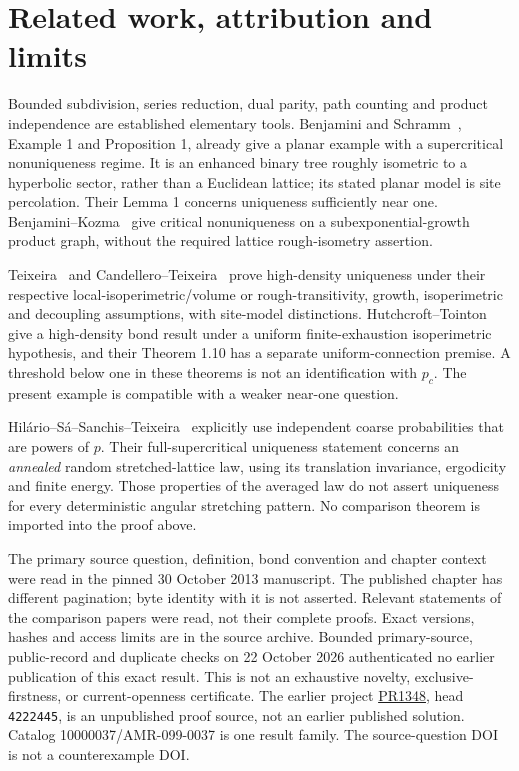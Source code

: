 \documentclass[11pt]{article}
\theoremstyle{definition}
\begin{document}
\section{Related work, attribution and limits}
Bounded subdivision, series reduction, dual parity, path counting and
product independence are established elementary tools.
Benjamini and Schramm~\cite{bs}, Example 1 and Proposition 1,
already give a planar example with a supercritical nonuniqueness regime.
It is an enhanced binary tree roughly isometric to a hyperbolic sector,
rather than a Euclidean lattice; its stated planar model is site percolation.
Their Lemma 1 concerns uniqueness sufficiently near one.
Benjamini--Kozma~\cite[Theorem 1]{bk} give critical nonuniqueness on
a subexponential-growth product graph, without the required lattice
rough-isometry assertion.

Teixeira~\cite[Theorem 1.4]{teixeira} and
Candellero--Teixeira~\cite[Theorem 1.8]{ct} prove high-density uniqueness
under their respective local-isoperimetric/volume or rough-transitivity,
growth, isoperimetric and decoupling assumptions, with site-model distinctions.
Hutchcroft--Tointon~\cite[Theorem 1.8]{ht} give a high-density bond result
under a uniform finite-exhaustion isoperimetric hypothesis, and their
Theorem 1.10 has a separate uniform-connection premise.
A threshold below one in these theorems is not an identification with $p_c$.
The present example is compatible with a weaker near-one question.

Hil\'ario--S\'a--Sanchis--Teixeira~\cite[Section 2 and Remark 5]{hsst}
explicitly use independent coarse probabilities that are powers of $p$.
Their full-supercritical uniqueness statement concerns an \emph{annealed}
random stretched-lattice law, using its translation invariance, ergodicity
and finite energy. Those properties of the averaged law do not assert
uniqueness for every deterministic angular stretching pattern.
No comparison theorem is imported into the proof above.

The primary source question, definition, bond convention and chapter context
were read in the pinned 30 October 2013 manuscript. The published chapter
has different pagination; byte identity with it is not asserted.
Relevant statements of the comparison papers were read, not their complete
proofs. Exact versions, hashes and access limits are in the source archive.
Bounded primary-source, public-record and duplicate checks on
22 October 2026 authenticated no earlier publication of this exact result.
This is not an exhaustive novelty, exclusive-firstness, or current-openness
certificate. The earlier project \href{https://github.com/AlecKriebel/Math/pull/1348}{PR1348},
head \texttt{4222445}, is an unpublished proof source, not an earlier
published solution. Catalog 10000037/AMR-099-0037 is one result family.
The source-question DOI is not a counterexample DOI.
\end{document}
